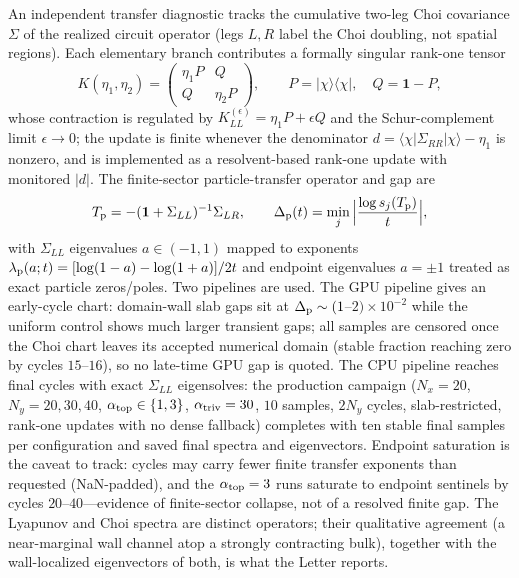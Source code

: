 \documentclass[aps,prl,onecolumn,superscriptaddress,nofootinbib]{revtex4-2}
\newcommand{\atopo}{\alpha_{\rm top}}
\newcommand{\atriv}{\alpha_{\rm triv}}
\newcommand{\Dp}{\Delta_{\rm p}}
\newcommand{\ket}[1]{|#1\rangle}
\newcommand{\bra}[1]{\langle#1|}
\begin{document}
An independent transfer diagnostic tracks the cumulative two-leg Choi covariance $\Sigma$ of the realized circuit operator (legs $L,R$ label the Choi doubling, not spatial regions).  Each elementary branch contributes a formally singular rank-one tensor
\begin{equation}
  K(\eta_1,\eta_2)=
  \begin{pmatrix}
    \eta_1 P & Q\\
    Q & \eta_2 P
  \end{pmatrix},
  \qquad P=\ket{\chi}\bra{\chi},\quad Q=\mathbf{1}-P,
\end{equation}
whose contraction is regulated by $K^{(\epsilon)}_{LL}=\eta_1P+\epsilon Q$ and the Schur-complement limit $\epsilon\to0$; the update is finite whenever the denominator $d=\bra{\chi}\Sigma_{RR}\ket{\chi}-\eta_1$ is nonzero, and is implemented as a resolvent-based rank-one update with monitored $|d|$.  The finite-sector particle-transfer operator and gap are
\begin{equation}
  T_{\rm p}=-(\mathbf{1}+\Sigma_{LL})^{-1}\Sigma_{LR},
  \qquad
  \Dp(t)=\min_j\Big|\frac{\log s_j(T_{\rm p})}{t}\Big|,
  \label{eq:sm-choi}
\end{equation}
with $\Sigma_{LL}$ eigenvalues $a\in(-1,1)$ mapped to exponents $\lambda_{\rm p}(a;t)=[\log(1-a)-\log(1+a)]/2t$ and endpoint eigenvalues $a=\pm1$ treated as exact particle zeros/poles.  Two pipelines are used.  The GPU pipeline gives an early-cycle chart: domain-wall slab gaps sit at $\Dp\sim(1$--$2)\times10^{-2}$ while the uniform control shows much larger transient gaps; all samples are censored once the Choi chart leaves its accepted numerical domain (stable fraction reaching zero by cycles $15$--$16$), so no late-time GPU gap is quoted.  The CPU pipeline reaches final cycles with exact $\Sigma_{LL}$ eigensolves: the production campaign ($N_x=20$, $N_y=20,30,40$, $\atopo\in\{1,3\}$, $\atriv=30$, $10$ samples, $2N_y$ cycles, slab-restricted, rank-one updates with no dense fallback) completes with ten stable final samples per configuration and saved final spectra and eigenvectors.  Endpoint saturation is the caveat to track: cycles may carry fewer finite transfer exponents than requested (NaN-padded), and the $\atopo=3$ runs saturate to endpoint sentinels by cycles $20$--$40$---evidence of finite-sector collapse, not of a resolved finite gap.  The Lyapunov and Choi spectra are distinct operators; their qualitative agreement (a near-marginal wall channel atop a strongly contracting bulk), together with the wall-localized eigenvectors of both, is what the Letter reports.
\end{document}
